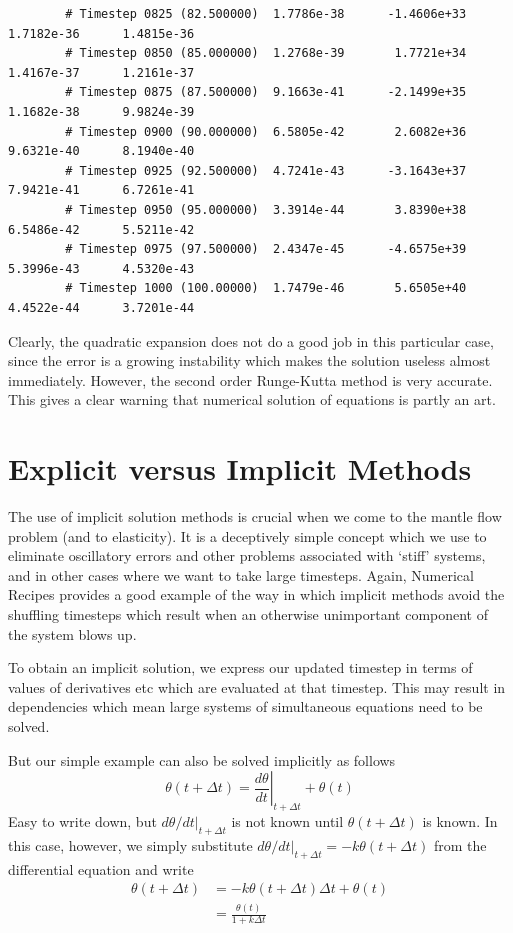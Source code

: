 \documentclass[10pt]{article}
\begin{document}
{\begin{verbatim}
		# Timestep 0825 (82.500000)	 1.7786e-38 	 -1.4606e+33 	 1.7182e-36 	 1.4815e-36 
		# Timestep 0850 (85.000000)	 1.2768e-39 	  1.7721e+34 	 1.4167e-37 	 1.2161e-37 
		# Timestep 0875 (87.500000)	 9.1663e-41 	 -2.1499e+35 	 1.1682e-38 	 9.9824e-39 
		# Timestep 0900 (90.000000)	 6.5805e-42 	  2.6082e+36 	 9.6321e-40 	 8.1940e-40 
		# Timestep 0925 (92.500000)	 4.7241e-43 	 -3.1643e+37 	 7.9421e-41 	 6.7261e-41 
		# Timestep 0950 (95.000000)	 3.3914e-44 	  3.8390e+38 	 6.5486e-42 	 5.5211e-42 
		# Timestep 0975 (97.500000)	 2.4347e-45 	 -4.6575e+39 	 5.3996e-43 	 4.5320e-43 
		# Timestep 1000 (100.00000)	 1.7479e-46 	  5.6505e+40 	 4.4522e-44 	 3.7201e-44 
		\end{verbatim}
	}   %
	
	Clearly, the quadratic expansion does not do a good job in this particular case, since
	the error is a growing instability which makes the solution useless almost immediately.
	However, the second order Runge-Kutta method is very accurate. 
	This gives a clear warning that numerical solution of equations is partly an 
	art. 
	

\section{Explicit versus Implicit Methods}

	The use of implicit solution methods is crucial when we come to the 
	mantle flow problem (and to elasticity). It is a deceptively simple concept
	which we use to eliminate oscillatory errors and other problems associated
	with `stiff' systems, and in other cases where we want to take large timesteps.
	Again, Numerical Recipes provides a good example of the way in which
	implicit methods avoid the shuffling timesteps which result when an otherwise
	unimportant component of the system blows up.

	To obtain an implicit solution, we express our updated timestep in terms of
	values of derivatives etc which are evaluated at that timestep. This may 
	result in dependencies which mean large systems of simultaneous equations
	need to be solved. 
	
	But our simple example can also be solved implicitly as follows
		\begin{equation}
			\theta(t+\Delta t) = \left. \frac{d \theta}{d t} \right|_{t+\Delta t} + \theta(t)
		\end{equation}	
	Easy to write down, but $\left. d \theta/ dt \right|_{t+\Delta t}$ is not known  until $\theta(t+\Delta t)$
	is known. In this case, however, we simply substitute $\left. d \theta/ dt \right|_{t+\Delta t}= -k \theta(t+\Delta t)$
	from the differential equation and write
		\begin{equation}
			\begin{split}
				\theta(t+\Delta t)  & = -k \theta(t+\Delta t) \Delta t + \theta(t) \\
												& = \frac{\theta(t) }{ 1 + k\Delta t}
			\end{split}
		\end{equation}
\end{document}
